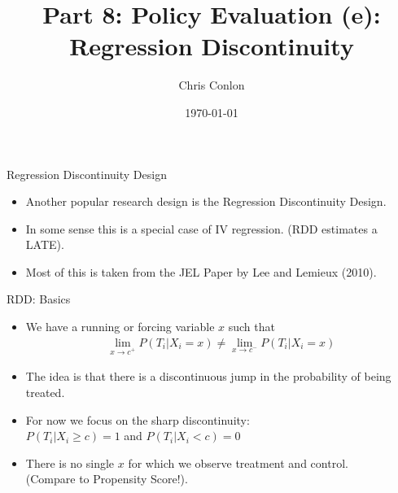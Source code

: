 \documentclass[xcolor=pdftex,dvipsnames,table,mathserif,aspectratio=169]{beamer}
\begin{document}
\title{Part 8: Policy Evaluation (e):\\
 Regression Discontinuity}
\author{Chris Conlon}
\date{\today}

\frame{\titlepage}
\begin{frame}{Regression Discontinuity Design}
\begin{itemize}
\item Another popular research design is the \alert{Regression Discontinuity Design}.
\item In some sense this is a special case of IV regression. (RDD estimates a LATE).
\item Most of this is taken from the JEL Paper by Lee and Lemieux (2010).
\end{itemize}              
\end{frame}

\begin{frame}{RDD: Basics}
\begin{itemize}
\item We have a \alert{running or forcing variable} $x$ such that 
\begin{eqnarray*}
\lim_{x\rightarrow c^{+}} P(T_i | X_i = x) \neq \lim_{x\rightarrow c^{-}}P(T_i | X_i = x)
\end{eqnarray*}
\item The idea is that there is a \alert{discontinuous jump} in the \alert{probability of being treated}.
\item For now we focus on the \alert{sharp discontinuity}:\\
 $P(T_i | X_i \geq c) =1$ and $P(T_i | X_i < c) =0$
 \item There is no single $x$ for which we observe treatment and control.\\
  (Compare to Propensity Score!).
\end{itemize}              
\end{frame}
\end{document}
